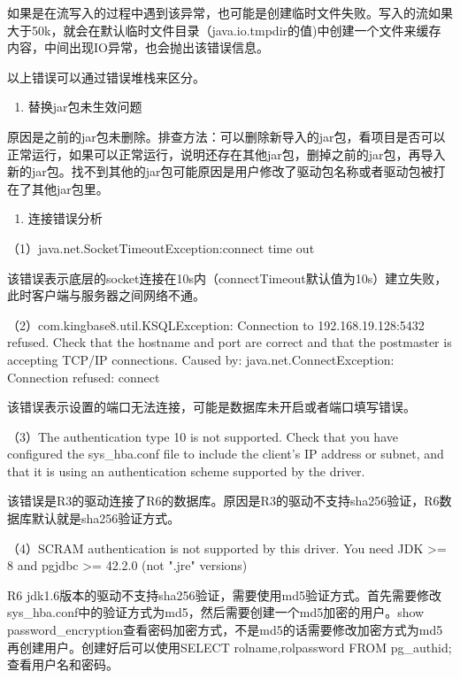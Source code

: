 \documentclass[a4,10pt,oneside,english]{sphinxmanual}
\begin{document}
如果是在流写入的过程中遇到该异常，也可能是创建临时文件失败。写入的流如果大于50k，就会在默认临时文件目录（java.io.tmpdir的值)中创建一个文件来缓存内容，中间出现IO异常，也会抛出该错误信息。

以上错误可以通过错误堆栈来区分。
\begin{enumerate}
%
\setcounter{enumi}{5}
\item {} 
替换jar包未生效问题

\end{enumerate}

原因是之前的jar包未删除。排查方法：可以删除新导入的jar包，看项目是否可以正常运行，如果可以正常运行，说明还存在其他jar包，删掉之前的jar包，再导入新的jar包。找不到其他的jar包可能原因是用户修改了驱动包名称或者驱动包被打在了其他jar包里。
\begin{enumerate}
%
\setcounter{enumi}{6}
\item {} 
连接错误分析

\end{enumerate}

（1）java.net.SocketTimeoutException:connect time out

该错误表示底层的socket连接在10s内（connectTimeout默认值为10s）建立失败，此时客户端与服务器之间网络不通。

（2）com.kingbase8.util.KSQLException: Connection to 192.168.19.128:5432 refused. Check that the hostname and port are correct and that the postmaster is accepting TCP/IP connections.
Caused by: java.net.ConnectException: Connection refused: connect

该错误表示设置的端口无法连接，可能是数据库未开启或者端口填写错误。

（3）The authentication type 10 is not supported. Check that you have configured the sys\_hba.conf file to include the client's IP address or subnet, and that it is using an authentication scheme supported by the driver.

该错误是R3的驱动连接了R6的数据库。原因是R3的驱动不支持sha256验证，R6数据库默认就是sha256验证方式。

（4）SCRAM authentication is not supported by this driver. You need JDK >= 8 and pgjdbc >= 42.2.0 (not ".jre" versions)

R6 jdk1.6版本的驱动不支持sha256验证，需要使用md5验证方式。首先需要修改sys\_hba.conf中的验证方式为md5，然后需要创建一个md5加密的用户。show password\_encryption查看密码加密方式，不是md5的话需要修改加密方式为md5再创建用户。创建好后可以使用SELECT rolname,rolpassword FROM pg\_authid;查看用户名和密码。
\end{document}
